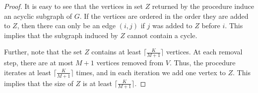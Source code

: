 \documentclass[letterpaper, 10 pt, conference]{ieeeconf}
\begin{document}
\begin{proof}




%
%

It is easy to see that the vertices in set $Z$ returned by the procedure induce an acyclic subgraph of $G$. If the vertices are ordered in the order they are added to $Z$, then there can only be an edge $(i,j)$ if $j$ was added to $Z$ before $i$. This implies that the subgraph induced by $Z$ cannot contain a cycle. 


Further, note that the set $Z$ contains at least $\lceil \frac{K}{M+1} \rceil$ vertices. At each removal step, there are at most $M+1$ vertices removed from $V$. %
Thus, the procedure iterates at least $\lceil \frac{K}{M+1} \rceil$ times, and in each iteration we add one vertex to $Z$. This implies that the size of $Z$ is at least  $\lceil \frac{K}{M+1} \rceil$.
\end{proof}

\end{document}
